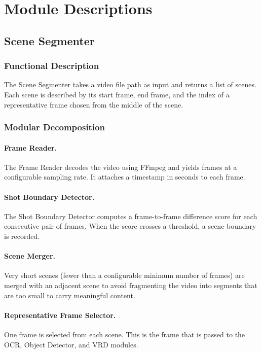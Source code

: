 \documentclass[12pt, a4paper]{report}
\begin{document}
\section{Module Descriptions}

\subsection{Scene Segmenter}

\subsubsection{Functional Description}

The Scene Segmenter takes a video file path as input and returns a list
of scenes. Each scene is described by its start frame, end frame, and
the index of a representative frame chosen from the middle of the scene.

\subsubsection{Modular Decomposition}

\paragraph{Frame Reader.}
The Frame Reader decodes the video using FFmpeg and yields frames at a
configurable sampling rate. It attaches a timestamp in seconds to each
frame.

\paragraph{Shot Boundary Detector.}
The Shot Boundary Detector computes a frame-to-frame difference score for
each consecutive pair of frames. When the score crosses a threshold, a
scene boundary is recorded.

\paragraph{Scene Merger.}
Very short scenes (fewer than a configurable minimum number of frames)
are merged with an adjacent scene to avoid fragmenting the video into
segments that are too small to carry meaningful content.

\paragraph{Representative Frame Selector.}
One frame is selected from each scene. This is the frame that is passed
to the OCR, Object Detector, and VRD modules.
\end{document}

